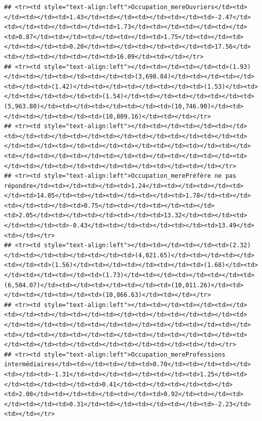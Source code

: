 \documentclass[
]{article}
\begin{document}
\begin{verbatim}
## <tr><td style="text-align:left">Occupation_mereOuvriers</td><td></td><td></td><td>1.43</td><td></td><td></td><td></td><td>-2.47</td><td></td><td></td><td></td><td>1.73</td><td></td><td></td><td></td><td>0.87</td><td></td><td></td><td></td><td>1.75</td><td></td><td></td><td></td><td>0.20</td><td></td><td></td><td></td><td>17.56</td><td></td><td></td><td></td><td>16.09</td><td></td></tr>
## <tr><td style="text-align:left"></td><td></td><td></td><td>(1.93)</td><td></td><td></td><td></td><td>(3,698.84)</td><td></td><td></td><td></td><td>(1.42)</td><td></td><td></td><td></td><td>(1.53)</td><td></td><td></td><td></td><td>(1.54)</td><td></td><td></td><td></td><td>(5,963.80)</td><td></td><td></td><td></td><td>(10,746.90)</td><td></td><td></td><td></td><td>(10,809.16)</td><td></td></tr>
## <tr><td style="text-align:left"></td><td></td><td></td><td></td><td></td><td></td><td></td><td></td><td></td><td></td><td></td><td></td><td></td><td></td><td></td><td></td><td></td><td></td><td></td><td></td><td></td><td></td><td></td><td></td><td></td><td></td><td></td><td></td><td></td><td></td><td></td><td></td><td></td></tr>
## <tr><td style="text-align:left">Occupation_merePréfère ne pas répondre</td><td></td><td></td><td>1.24</td><td></td><td></td><td></td><td>14.05</td><td></td><td></td><td></td><td>1.78</td><td></td><td></td><td></td><td>0.75</td><td></td><td></td><td></td><td>2.05</td><td></td><td></td><td></td><td>13.32</td><td></td><td></td><td></td><td>-0.43</td><td></td><td></td><td></td><td>13.49</td><td></td></tr>
## <tr><td style="text-align:left"></td><td></td><td></td><td>(2.32)</td><td></td><td></td><td></td><td>(4,021.65)</td><td></td><td></td><td></td><td>(1.56)</td><td></td><td></td><td></td><td>(1.68)</td><td></td><td></td><td></td><td>(1.73)</td><td></td><td></td><td></td><td>(6,504.07)</td><td></td><td></td><td></td><td>(10,011.26)</td><td></td><td></td><td></td><td>(10,866.63)</td><td></td></tr>
## <tr><td style="text-align:left"></td><td></td><td></td><td></td><td></td><td></td><td></td><td></td><td></td><td></td><td></td><td></td><td></td><td></td><td></td><td></td><td></td><td></td><td></td><td></td><td></td><td></td><td></td><td></td><td></td><td></td><td></td><td></td><td></td><td></td><td></td><td></td><td></td></tr>
## <tr><td style="text-align:left">Occupation_mereProfessions intermédiaires</td><td></td><td></td><td>0.70</td><td></td><td></td><td></td><td>-1.31</td><td></td><td></td><td></td><td>1.25</td><td></td><td></td><td></td><td>0.41</td><td></td><td></td><td></td><td>2.08</td><td></td><td></td><td></td><td>0.92</td><td></td><td></td><td></td><td>0.31</td><td></td><td></td><td></td><td>-2.23</td><td></td></tr>

\end{verbatim}
\end{document}
